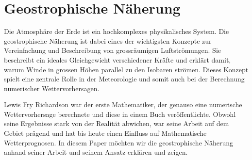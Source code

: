 %
%
%
%
\chapter{Geostrophische Näherung\label{chapter:geostrophisch}}
\begin{refsection}

Die Atmosphäre der Erde ist ein hochkomplexes physikalisches System.
Die geostrophische Näherung ist dabei eines der wichtigsten Konzepte zur Vereinfachung und Beschreibung von grossräumigen Luftströmungen.
Sie beschreibt ein ideales Gleichgewicht verschiedener Kräfte und erklärt damit, warum Winde in grossen Höhen parallel zu den Isobaren strömen. 
Dieses Konzept spielt eine zentrale Rolle in der Meteorologie und somit auch bei der Berechnung numerischer Wettervorhersagen.

Lewis Fry Richardson war der erste Mathematiker, der genauso eine numerische Wettervorhersage berechnete und diese in einem Buch veröffentlichte.
Obwohl seine Ergebnisse stark von der Realität abwichen, war seine Arbeit auf dem Gebiet prägend und hat bis heute einen Einfluss auf Mathematische Wetterprognosen.
In diesem Paper möchten wir die geostrophische Näherung anhand seiner Arbeit und seinem Ansatz erklären und zeigen. 






\printbibliography[heading=subbibliography]
\end{refsection}
